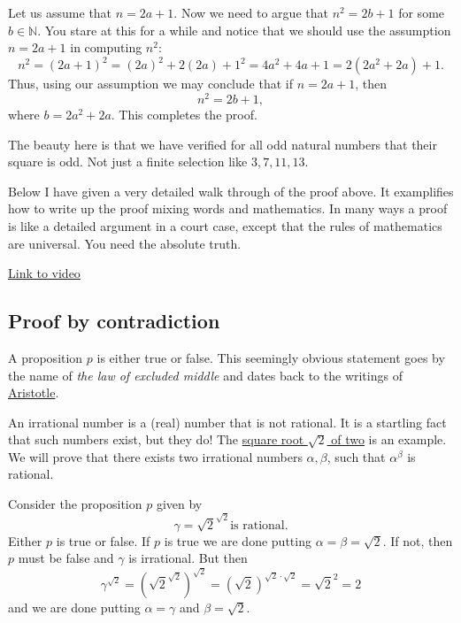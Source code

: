Let us assume that $n = 2 a + 1$. Now we need to argue that $
  n^2 = 2 b + 1$ for some $b\in \mathbb{N}$. You stare at this for a while
and notice that we should use the assumption $n=2 a + 1$ in
computing $n^2$:
$$
  n^2 = (2 a + 1)^2 = (2 a)^2 + 2 (2 a) + 1^2 = 4 a^2 + 4 a + 1 =
  2(2 a^2 + 2 a) + 1.
$$
Thus, using our assumption we may conclude that if $n = 2 a + 1$, then
$$
  n^2 = 2 b + 1,
$$
where $b=2a^2+ 2 a$. This completes the proof.

The beauty here is that we have verified for all odd natural numbers
that their square is odd. Not just a finite selection like
$3, 7, 11, 13$.

Below I have given a very detailed walk through of the proof above. It
examplifies how to write up the proof mixing words and mathematics. In
many ways a proof is like a detailed argument in a court case, except
that the rules of mathematics are universal. You need the absolute truth.

\begin{video}\label{Video:proofexample}
  \href{https://www.youtube.com/embed/1tewESCAP2k?rel=0}{Link to video}
\end{video}

\subsection{Proof by contradiction}

A proposition $p$ is either true or false. This seemingly obvious statement
goes by the name of \emph{the law of excluded middle} and dates back to the writings
of \href{https://en.wikipedia.org/wiki/Aristotle}{Aristotle}.

\begin{example}
  An irrational number is a (real) number that is not rational. It is a
  startling fact that such numbers exist, but they do! The \href{https://en.wikipedia.org/wiki/Square\_root\_of\_2}{square root $\sqrt{2}$ of two}
  is an example.
  We will prove that there exists two irrational numbers $\alpha, \beta$, such that
  $\alpha^\beta$ is rational.

  Consider the proposition $p$ given
  by
  $$
    \gamma = \sqrt{2}^{\sqrt{2}}\text{is rational.}   $$
  Either $p$ is true or false. If $p$ is true we are done putting $\alpha = \beta = \sqrt{2}$. If not, then
  $p$ must be false and $\gamma$ is irrational. But then
  $$
    \gamma^{\sqrt{2}} = \left(\sqrt{2}^{\sqrt{2}}\right)^{\sqrt{2}} = (\sqrt{2})^{\sqrt{2}\cdot \sqrt{2}} = \sqrt{2}^2 = 2
  $$
  and we are done putting $\alpha = \gamma$ and $\beta = \sqrt{2}$.
\end{example}

